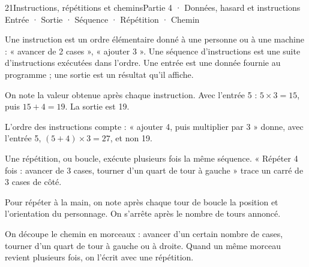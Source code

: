 \begin{ouverture}[algorithmique]{21}{Instructions, répétitions et chemins}{Partie 4 · Données, hasard et instructions}
{Entrée · Sortie · Séquence · Répétition · Chemin}
\end{ouverture}
\pagestyle{otMain}\essentiel\fontsize{11}{15}\selectfont
{}\label{cours-21-1}
\begin{definition}Une instruction est un ordre élémentaire donné à une personne ou à une machine : « avancer de 2 cases », « ajouter 3 ». Une séquence d’instructions est une suite d’instructions exécutées dans l’ordre. Une entrée est une donnée fournie au programme ; une sortie est un résultat qu’il affiche.\end{definition}
\label{fig-cours-21-1-cours-blocs}

\begin{savoirfaire}On note la valeur obtenue après chaque instruction. Avec l’entrée 5 : $5\times3=15$, puis $15+4=19$. La sortie est 19.\end{savoirfaire}
\begin{attention}L’ordre des instructions compte : « ajouter 4, puis multiplier par 3 » donne, avec l’entrée 5, $(5+4)\times3=27$, et non 19.\end{attention}
\clearpage
{}\label{cours-21-2}
\begin{definition}Une répétition, ou boucle, exécute plusieurs fois la même séquence. « Répéter 4 fois : avancer de 3 cases, tourner d’un quart de tour à gauche » trace un carré de 3 cases de côté.\end{definition}
\begin{savoirfaire}Pour répéter à la main, on note après chaque tour de boucle la position et l’orientation du personnage. On s’arrête après le nombre de tours annoncé.\end{savoirfaire}
\label{fig-cours-21-2-cours-chemin}

\begin{savoirfaire}On découpe le chemin en morceaux : avancer d’un certain nombre de cases, tourner d’un quart de tour à gauche ou à droite. Quand un même morceau revient plusieurs fois, on l’écrit avec une répétition.\end{savoirfaire}

